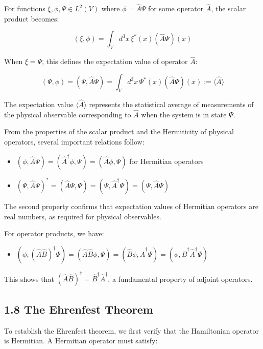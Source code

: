 \documentclass[italian]{HKNdocument}
\begin{document}
For functions $\xi, \phi, \Psi \in L^2(V)$ where $\phi = \hat{A}\Psi$ for some operator $\hat{A}$, the scalar product becomes:

\begin{equation*}
(\xi, \phi) = \int_V d^3x \, \xi^*(x)(\hat{A}\Psi)(x) \tag{1.80}
\end{equation*}

When $\xi = \Psi$, this defines the expectation value of operator $\hat{A}$:

\begin{equation*}
(\Psi, \phi) = (\Psi, \hat{A}\Psi) = \int_V d^3x \, \Psi^*(x)(\hat{A}\Psi)(x) := \langle\hat{A}\rangle \tag{1.81}
\end{equation*}

The expectation value $\langle\hat{A}\rangle$ represents the statistical average of measurements of the physical observable corresponding to $\hat{A}$ when the system is in state $\Psi$.

From the properties of the scalar product and the Hermiticity of physical operators, several important relations follow:

\begin{itemize}
  \item $(\phi, \hat{A}\Psi) = (\hat{A}^\dagger\phi, \Psi) = (\hat{A}\phi, \Psi)$ for Hermitian operators
  \item $(\Psi, \hat{A}\Psi)^* = (\hat{A}\Psi, \Psi) = (\Psi, \hat{A}^\dagger\Psi) = (\Psi, \hat{A}\Psi)$
\end{itemize}

The second property confirms that expectation values of Hermitian operators are real numbers, as required for physical observables.

For operator products, we have:
\begin{itemize}
  \item $(\phi, (\hat{A}\hat{B})^\dagger\Psi) = (\hat{A}\hat{B}\phi, \Psi) = (\hat{B}\phi, \hat{A}^\dagger\Psi) = (\phi, \hat{B}^\dagger\hat{A}^\dagger\Psi)$
\end{itemize}

This shows that $(\hat{A}\hat{B})^\dagger = \hat{B}^\dagger\hat{A}^\dagger$, a fundamental property of adjoint operators.

\subsection*{1.8 The Ehrenfest Theorem}

To establish the Ehrenfest theorem, we first verify that the Hamiltonian operator is Hermitian. A Hermitian operator must satisfy:
\end{document}
